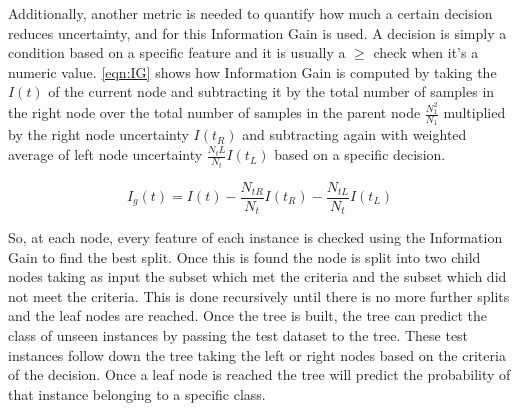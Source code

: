 Additionally, another metric is needed to quantify how much a certain decision reduces uncertainty, and for this Information Gain is used. A decision is simply a condition based on a specific feature and it is usually a $\geq$ check when it's a numeric value. \autoref{eqn:IG} shows how Information Gain is computed by taking the $I(t)$ of the current node and subtracting it by the total number of samples in the right node over the total number of samples in the parent node $\frac{N_{1}^{2}}{N_{1}}$ multiplied by the right node uncertainty $I\left(t_{R}\right)$ and subtracting again with weighted average of left node uncertainty $\frac{N_{t} L}{N_{t}} I\left(t_{L}\right)$ based on a specific decision.


\begin{equation}
\label{eqn:IG}
I_{g}(t)=I(t)-\frac{N_{t R}}{N_{t}} I\left(t_{R}\right)-\frac{N_{t L}}{N_{t}} I\left(t_{L}\right)
\end{equation}


So, at each node, every feature of each instance is checked using the Information Gain to find the best split. Once this is found the node is split into two child nodes taking as input the subset which met the criteria and the subset which did not meet the criteria. This is done recursively until there is no more further splits and the leaf nodes are reached. Once the tree is built, the tree can predict the class of unseen instances by passing the test dataset to the tree. These test instances follow down the tree taking the left or right nodes based on the criteria of the decision. Once a leaf node is reached the tree will predict the probability of that instance belonging to a specific class. 






